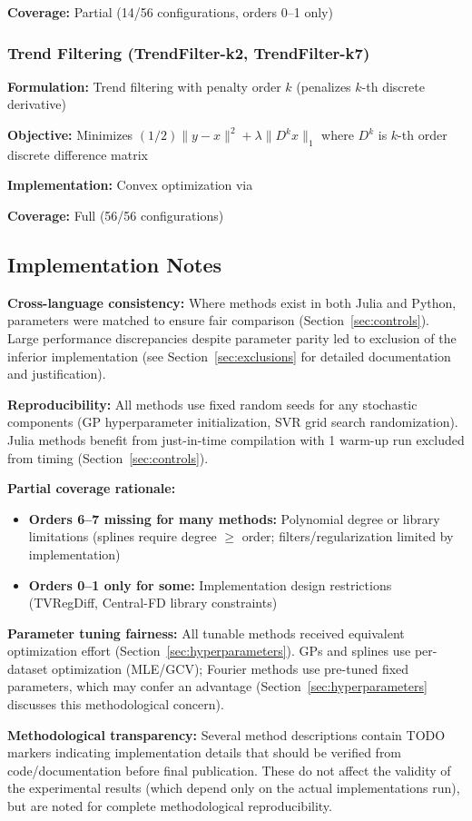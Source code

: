 \textbf{Coverage:} Partial (14/56 configurations, orders 0--1 only)

\subsubsection{Trend Filtering (TrendFilter-k2, TrendFilter-k7)}

\textbf{Formulation:} Trend filtering with penalty order $k$ (penalizes $k$-th discrete derivative)

\textbf{Objective:} Minimizes $(1/2)\|y - x\|^2 + \lambda \|D^k x\|_1$ where $D^k$ is $k$-th order discrete difference matrix

\textbf{Implementation:} Convex optimization via 

\textbf{Coverage:} Full (56/56 configurations)

\subsection{Implementation Notes}
\label{sec:implementation_notes}

\textbf{Cross-language consistency:} Where methods exist in both Julia and Python, parameters were matched to ensure fair comparison (Section~\ref{sec:controls}). Large performance discrepancies despite parameter parity led to exclusion of the inferior implementation (see Section~\ref{sec:exclusions} for detailed documentation and justification).

\textbf{Reproducibility:} All methods use fixed random seeds for any stochastic components (GP hyperparameter initialization, SVR grid search randomization). Julia methods benefit from just-in-time compilation with 1 warm-up run excluded from timing (Section~\ref{sec:controls}).

\textbf{Partial coverage rationale:}
\begin{itemize}
    \item \textbf{Orders 6--7 missing for many methods:} Polynomial degree or library limitations (splines require degree $\geq$ order; filters/regularization limited by implementation)
    \item \textbf{Orders 0--1 only for some:} Implementation design restrictions (TVRegDiff, Central-FD library constraints)
\end{itemize}

\textbf{Parameter tuning fairness:} All tunable methods received equivalent optimization effort (Section~\ref{sec:hyperparameters}). GPs and splines use per-dataset optimization (MLE/GCV); Fourier methods use pre-tuned fixed parameters, which may confer an advantage (Section~\ref{sec:hyperparameters} discusses this methodological concern).

\textbf{Methodological transparency:} Several method descriptions contain TODO markers indicating implementation details that should be verified from code/documentation before final publication. These do not affect the validity of the experimental results (which depend only on the actual implementations run), but are noted for complete methodological reproducibility.
